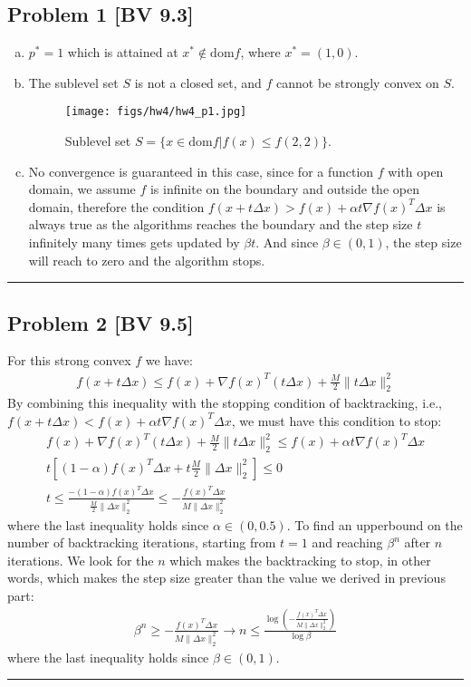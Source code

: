 \documentclass[12pt, letterpaper, twoside]{article}
\begin{document}
\subsection*{Problem 1 \small[BV 9.3]}
\begin{enumerate}[(a)]
    \item $p^*=1$ which is attained at $x^*\notin\text{dom}f$, where $x^*=(1,0)$.

    \item The sublevel set $S$ is not a closed set, and $f$ cannot be strongly convex on $S$.

    \begin{figure}[h!]
        \centering
        \texttt{[image: figs/hw4/hw4\_p1.jpg]}
        \caption{Sublevel set $S=\{x\in\text{dom}f|f(x)\leq f(2,2)\}.$}
        \label{fig:slopes}
    \end{figure}

    \item No convergence is guaranteed in this case, since for a function $f$ with open domain, we assume $f$ is infinite on the boundary and outside the open domain, therefore the condition $f(x+t\Delta x)>f(x)+\alpha t\nabla f(x)^T\Delta x$ is always true as the algorithms reaches the boundary and the step size $t$ infinitely many times gets updated by $\beta t$. And since $\beta\in(0,1)$, the step size will reach to zero and the algorithm stops.
\end{enumerate}
\hrule


\subsection*{Problem 2 \small[BV 9.5]}
For this strong convex $f$ we have:
\begin{align*}
    f(x+t\Delta x)\leq f(x) + \nabla f(x)^T(t\Delta x)+\frac{M}{2}\|t\Delta x\|_2^2
\end{align*}
By combining this inequality with the stopping condition of backtracking, i.e., $f(x+t\Delta x)<f(x)+\alpha t\nabla f(x)^T\Delta x$, we must have this condition to stop:
\begin{align*}
   f(x)+\nabla f(x)^T(t\Delta x)+\frac{M}{2}\|t\Delta x\|_2^2 \leq f(x)+ \alpha t\nabla f(x)^T\Delta x\\
    t[(1-\alpha)f(x)^T\Delta x+t\frac{M}{2}\|\Delta x\|_2^2]\leq0\\
    t\leq\frac{-(1-\alpha)f(x)^T\Delta x}{\frac{M}{2}\|\Delta x\|_2^2}\leq -\frac{f(x)^T\Delta x}{M\|\Delta x\|_2^2}
\end{align*}
where the last inequality holds since $\alpha\in(0,0.5)$.
To find an upperbound on the number of backtracking iterations, starting from $t=1$ and reaching $\beta^n$ after $n$ iterations. We look for the $n$ which makes the backtracking to stop, in other words, which makes the step size greater than the value we derived in previous part:
\begin{align*}
    \beta^n\geq-\frac{f(x)^T\Delta x}{M\|\Delta x\|_2^2}\rightarrow n\leq\frac{\log(-\frac{f(x)^T\Delta x}{M\|\Delta x\|_2^2})}{\log\beta}
\end{align*}
where the last inequality holds since $\beta\in(0,1)$.
\hrule
\end{document}
